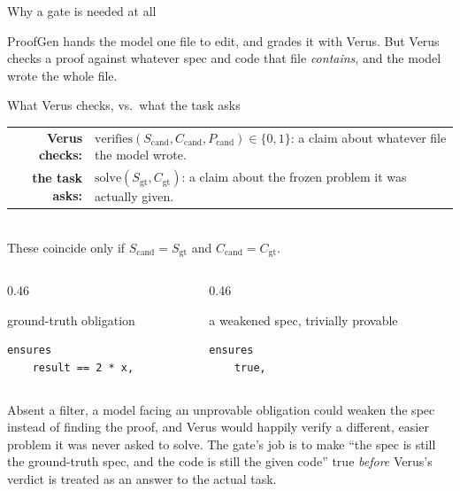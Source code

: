 \documentclass[aspectratio=169,10pt]{beamer}
\begin{document}
\begin{frame}[fragile]{Why a gate is needed at all}

{\scriptsize
ProofGen hands the model one file to edit, and grades it with Verus. But Verus checks a
proof against whatever spec and code that file \emph{contains}, and the model wrote the
whole file.
}

\vspace{5pt}
\begin{defbox}{What Verus checks, vs.\ what the task asks}
\scriptsize
\begin{tabular}{@{}rl@{}}
\textbf{Verus checks:} & $\mathrm{verifies}(S_{\mathrm{cand}}, C_{\mathrm{cand}},
                          P_{\mathrm{cand}}) \in \{0,1\}$: a claim about whatever file the
                          model wrote.\\[4pt]
\textbf{the task asks:} & $\mathrm{solve}(S_{\mathrm{gt}}, C_{\mathrm{gt}})$: a claim about
                          the frozen problem it was actually given.
\end{tabular}\\[6pt]
\scriptsize These coincide only if $S_{\mathrm{cand}}{=}S_{\mathrm{gt}}$ and
$C_{\mathrm{cand}}{=}C_{\mathrm{gt}}$.
\end{defbox}

\vspace{6pt}
\begin{columns}[T]
\begin{column}{0.46\textwidth}
\begin{codebox}[lgTeal]{ground-truth obligation}
\begin{lstlisting}[basicstyle=\ttfamily\scriptsize\color{lgInk}]
ensures
    result == 2 * x,
\end{lstlisting}
\end{codebox}
\end{column}
\begin{column}{0.46\textwidth}
\begin{codebox}[lgRed]{a weakened spec, trivially provable}
\begin{lstlisting}[basicstyle=\ttfamily\scriptsize\color{lgInk}]
ensures
    true,
\end{lstlisting}
\end{codebox}
\end{column}
\end{columns}

\vspace{6pt}
\begin{callout}[lgAccent]
\scriptsize
Absent a filter, a model facing an unprovable obligation could weaken the spec instead of
finding the proof, and Verus would happily verify a different, easier problem it was never
asked to solve. The gate's job is to make ``the spec is still the ground-truth spec, and the
code is still the given code'' true \emph{before} Verus's verdict is treated as an answer to
the actual task.
\end{callout}

\end{frame}
\end{document}
